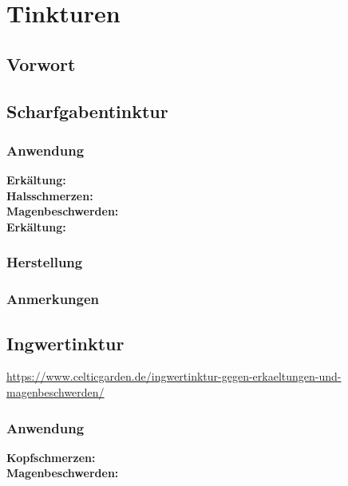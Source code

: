 \chapter{Tinkturen}

\section{Vorwort}

\lipsum[1-5]
\newpage


\section{Scharfgabentinktur}

\subsection{Anwendung}

\textbf{Erkältung:} \\ 

\textbf{Halsschmerzen:} \\ 

\textbf{Magenbeschwerden:} \\ 

\textbf{Erkältung:} \\ 


\subsection{Herstellung}

\subsection{Anmerkungen}



\section{Ingwertinktur}

\url{https://www.celticgarden.de/ingwertinktur-gegen-erkaeltungen-und-magenbeschwerden/}


\subsection{Anwendung}

\textbf{Kopfschmerzen:} \\ 

\textbf{Magenbeschwerden:} \\ 

